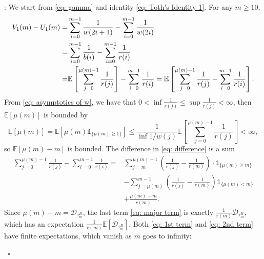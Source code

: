 \documentclass[twoside,12pt,a4paper]{article}
\numberwithin{equation}{section}
\newenvironment{proof}[1][Proof]{{\sc #1}:}{~\hfill $\square$}
\begin{document}
		\begin{proof} 
			We start from \eqref{eq: gamma} and identity \eqref{eq: Toth's Identity 1}. For any $m \geq 10$,
			\begin{align}
				V_1(m) - U_1(m) =& \sum_{i=0}^{m-1} \frac{1}{w(2i+1)} -\sum_{i=0}^{m-1} \frac{1}{w(2i)} 
				\notag \\
				=& \sum_{i=0}^{m-1} \frac{1}{b(i)} -\sum_{i=0}^{m-1} \frac{1}{r(i)} 
				\notag \\
				=& 	\mathbb{E}\left[  \sum_{j=0}^{ \mu(m)-1 } \frac{1}{r(j)}   \right] - \sum_{i=0}^{m-1} \frac{1}{r(i)} = \mathbb{E}\left[  \sum_{j=0}^{ \mu(m)-1 } \frac{1}{r(j)}    - \sum_{i=0}^{m-1} \frac{1}{r(i)}\right]. \label{eq: difference}
			\end{align}
			From \eqref{eq: asymptotics of w}, we have that $0< \inf \frac{1}{r(j)} \leq \sup \frac{1}{r(j)} <\infty $, then $\mathbb{E}\left[\mu(m)\right]$ is bounded by
			$$\mathbb{E}\left[ \mu(m) \right] = \mathbb{E}\left[ \mu(m)\mathbb{1}_{\{\mu(m)\geq 1 \} } \right] \leq  \frac{1}{\inf 1/w(j) }\mathbb{E}\left[  \sum_{j=0}^{ \mu(m)-1 } \frac{1}{r(j)}   \right] <\infty, $$ 
			so $ \mathbb{E}\left[ \mu(m) -m\right]  $ is bounded.
			The difference in \eqref{eq: difference} is a sum
			\begin{align} 
				\sum_{j=0}^{ \mu(m)-1 } \frac{1}{r(j)} - \sum_{i=0}^{m-1} \frac{1}{r(i)} =& \sum_{j=m}^{\mu(m)-1} \left(\frac{1}{r(j)} -\frac{1}{r(m)} \right) \cdot\mathbb{1}_{\{\mu(m)\geq m\}} 
				\label{eq: 1st term}
				\\	
				& - \sum_{j=\mu(m)}^{m-1} \left(\frac{1}{r(j)} -\frac{1}{r(m)} \right) \mathbb{1}_{\{\mu(m)< m\}} 
				\label{eq: 2nd term}
				\\
				& + \frac{\mu(m)-m}{ r(m) }. \label{eq: major term}
			\end{align} 
			Since $\mu(m)-m =  \mathcal{D}_{\tau^B_m}$, the last term \eqref{eq: major term} is exactly $\frac{1}{r(m)} \mathcal{D}_{\tau^B_m}$, which has an expectation $\frac{1}{r(m)} \mathbb{E}\left[\mathcal{D}_{\tau^B_m}\right].$ Both \eqref{eq: 1st term} and \eqref{eq: 2nd term} have finite expectations, which vanish as $m$ goes to infinity:
			

\end{proof}
\end{document}
